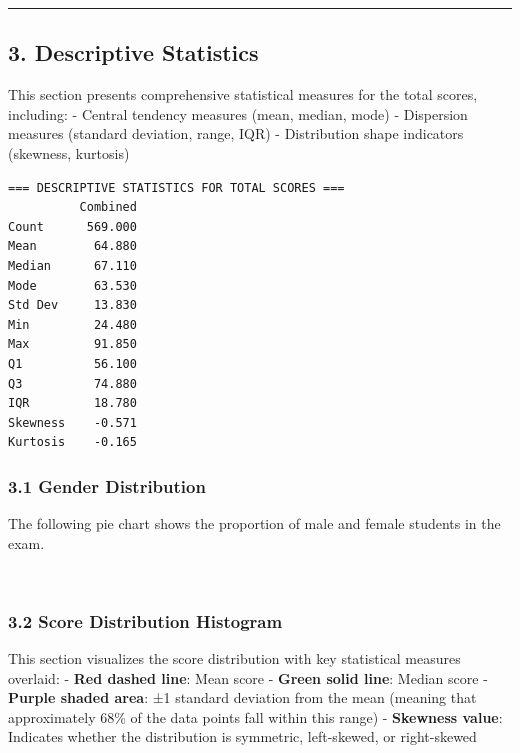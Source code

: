 \documentclass[11pt]{article}
\begin{document}
    \begin{center}\rule{0.5\linewidth}{0.5pt}\end{center}

    \subsection{3. Descriptive Statistics}\label{descriptive-statistics}

This section presents comprehensive statistical measures for the total
scores, including: - Central tendency measures (mean, median, mode) -
Dispersion measures (standard deviation, range, IQR) - Distribution
shape indicators (skewness, kurtosis)

    \begin{Verbatim}[commandchars=\\\{\}]
=== DESCRIPTIVE STATISTICS FOR TOTAL SCORES ===
          Combined
Count      569.000
Mean        64.880
Median      67.110
Mode        63.530
Std Dev     13.830
Min         24.480
Max         91.850
Q1          56.100
Q3          74.880
IQR         18.780
Skewness    -0.571
Kurtosis    -0.165
    \end{Verbatim}

    \subsubsection{3.1 Gender Distribution}\label{gender-distribution}

The following pie chart shows the proportion of male and female students
in the exam.

    \begin{center}
    \end{center}
    { \hspace*{\fill} \\}
    
    \subsubsection{3.2 Score Distribution
Histogram}\label{score-distribution-histogram}

This section visualizes the score distribution with key statistical
measures overlaid: - \textbf{Red dashed line}: Mean score -
\textbf{Green solid line}: Median score - \textbf{Purple shaded area}:
±1 standard deviation from the mean (meaning that approximately 68\% of
the data points fall within this range) - \textbf{Skewness value}:
Indicates whether the distribution is symmetric, left-skewed, or
right-skewed
\end{document}
